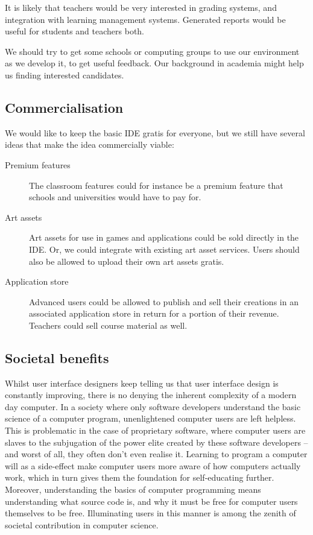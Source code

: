 It is likely that teachers would be very interested in grading systems, and 
integration with learning management systems. Generated reports would be 
useful for students and teachers both.

We should try to get some schools or computing groups to use our environment 
as we develop it, to get useful feedback. Our background in academia might
help us finding interested candidates.

\subsection{Commercialisation}

We would like to keep the basic IDE gratis for everyone, but we still have
several ideas that make the idea commercially viable:

\begin{description}
  \item[Premium features]
    The classroom features could for instance be a premium feature that schools
    and universities would have to pay for.
  \item[Art assets]
    Art assets for use in games and applications could be sold directly in the
    IDE. Or, we could integrate with existing art asset services. Users should 
    also be allowed to upload their own art assets gratis.
  \item[Application store]
    Advanced users could be allowed to publish and sell their creations in an 
    associated application store in return for a portion of their revenue. 
    Teachers could sell course material as well.
\end{description}

\subsection{Societal benefits}
Whilst user interface designers keep telling us that user interface design is 
constantly improving, there is no denying the inherent complexity of a modern 
day computer. In a society where only software developers understand the basic 
science of a computer program, unenlightened computer users are left helpless. 
This is problematic in the case of proprietary software, where computer users 
are slaves to the subjugation of the power elite created by these software 
developers -- and worst of all, they often don't even realise it. Learning to 
program a computer will as a side-effect make computer users more aware of how 
computers actually work, which in turn gives them the foundation for 
self-educating further. Moreover, understanding the basics of computer 
programming means understanding what source code is, and why it must be free 
for computer users themselves to be free. Illuminating users in this manner is 
among the zenith of societal contribution in computer science.

